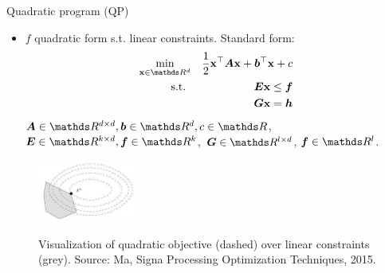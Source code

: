 \documentclass[11pt,compress,t,notes=noshow, xcolor=table]{beamer}
\begin{document}
\begin{vbframe}{Quadratic program (QP)}

\begin{itemize}
	\item $f$ quadratic form s.t. linear constraints. Standard form: 
	\vspace*{-0.3cm}
	\begin{eqnarray*}
	\min_{\xv \in \R^d} && \frac{1}{2} \xv^\top \bm{A} \xv + \bm{b}^\top \xv 
	+ c \\
	\text{s.t. } && \bm{E}\xv \le \bm{f} \\
	 && \bm{G}\xv = \bm{h} \\
	\end{eqnarray*}
	$\bm{A} \in \R^{d \times d}, \bm{b} \in \R^d, c \in \R$, $\bm{E} \in \R^{k \times d}, \bm{f} \in \R^k$, $\bm{G} \in \R^{l \times d}$, $\bm{f} \in \R^l$. 
\end{itemize}

	\begin{figure}
		\includegraphics[width=0.3\textwidth]{figure_man/quadratic-programm.jpeg} \\
		\begin{footnotesize}
		Visualization of quadratic objective (dashed) over linear constraints (grey). Source: Ma, Signa Processing Optimization Techniques, 2015. 
		\end{footnotesize}
	\end{figure}



\end{vbframe}
\end{document}
